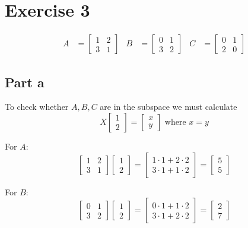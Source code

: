 \section{Exercise 3}
\begin{align*}
	A & = \begin{bmatrix}
		      1 & 2 \\
		      3 & 1
	      \end{bmatrix} &
	B & = \begin{bmatrix}
		      0 & 1 \\
		      3 & 2
	      \end{bmatrix} &
	C & = \begin{bmatrix}
		      0 & 1 \\
		      2 & 0
	      \end{bmatrix}
\end{align*}

\subsection{Part a}
To check whether $A,B,C$ are in the subspace we must calculate
\[
	X\begin{bmatrix}
		1 \\
		2
	\end{bmatrix} = \begin{bmatrix}
		x \\
		y
	\end{bmatrix} \text{ where } x = y
\]

For $A$:
\[
	\begin{bmatrix}
		1 & 2 \\
		3 & 1
	\end{bmatrix}\begin{bmatrix}
		1 \\
		2
	\end{bmatrix} =
	\begin{bmatrix}
		1\cdot 1 + 2\cdot 2 \\
		3\cdot 1 + 1\cdot 2
	\end{bmatrix} =
	\begin{bmatrix}
		5 \\
		5
	\end{bmatrix}
\]

For $B$:
\[
	\begin{bmatrix}
		0 & 1 \\
		3 & 2
	\end{bmatrix}\begin{bmatrix}
		1 \\
		2
	\end{bmatrix} =
	\begin{bmatrix}
		0\cdot 1 + 1\cdot 2 \\
		3\cdot 1 + 2\cdot 2
	\end{bmatrix} =
	\begin{bmatrix}
		2 \\
		7
	\end{bmatrix}
\]

